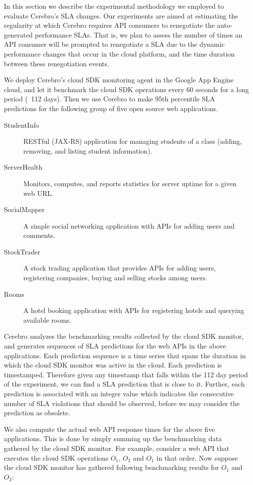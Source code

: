 In this section we describe the experimental methodology we employed to evaluate Cerebro's SLA
changes. Our experiments are aimed at estimating the regularity at
which Cerebro requires API consumers to renegotiate the auto-generated performance SLAs. That is,
we plan to assess the number of times an API consumer will be prompted to renegotiate a
SLA due to the dynamic performance changes that occur in the cloud platform, and the time duration
between these renegotiation events.

We deploy Cerebro's cloud SDK monitoring agent in the Google App Engine cloud, and let it benchmark
the cloud SDK operations every 60 seconds for a long period (~112 days). Then we use Cerebro
to make 95th percentile SLA predictions for the following group of five open source web applications. 

\begin{description}
\item[StudentInfo] RESTful (JAX-RS) application for managing
students of a class (adding, removing, and listing student information).
\item[ServerHealth] Monitors, computes, and reports statistics for server
uptime for a given web URL.
\item[SocialMapper] A simple social networking application with APIs for
adding users and comments.
\item[StockTrader] A stock trading application that
provides APIs for adding users, registering companies, buying and selling
stocks among users. 
\item[Rooms] A hotel booking application with APIs
for registering hotels and querying available rooms.
\end{description}

Cerebro analyzes the benchmarking results collected
by the cloud SDK monitor, and generates sequences of SLA predictions for the web APIs in the above
applications. Each prediction sequence
is a time series that spans the duration in which the cloud SDK monitor was active
in the cloud. Each prediction is timestamped. Therefore given any timestamp that falls within the
112 day period of the experiment, we can find a SLA prediction that is close to it. Further, each prediction
is associated with an integer value which indicates the consecutive number of SLA violations that should be
observed, before we may consider the prediction as obsolete.

We also compute the actual web API response times for the above five applications. This is done
by simply summing up the benchmarking data gathered by the cloud SDK monitor. For example,
consider a web API that executes the cloud SDK operations $O_{1}$, $O_{2}$ and $O_{1}$ in that order. 
Now suppose the cloud SDK monitor has gathered following benchmarking results for $O_{1}$ and
$O_{2}$:

